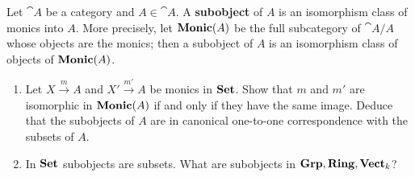 \documentclass[11pt,a4paper]{article}
\begin{document}
\begin{exercise}
    Let $\cat{A}$ be a category and $A\in\cat{A}$. A \textbf{subobject} of $A$ is an isomorphism class of monics into $A$. More precisely, let $\mathbf{Monic}(A)$ be the full subcategory of $\cat{A}/A$ whose objects are the monics; then a subobject of $A$ is an isomorphism class of objects of $\mathbf{Monic}(A)$.
    \begin{enumerate}[label=(\alph*)]
        \item Let $X\xrightarrow{m}A$ and $X'\xrightarrow{m'}A$ be monics in $\mathbf{Set}$. Show that $m$ and $m'$ are isomorphic in $\mathbf{Monic}(A)$ if and only if they have the same image. Deduce that the subobjects of $A$ are in canonical one-to-one correspondence with the subsets of $A$.
        \item In $\mathbf{Set}$ subobjects are subsets. What are subobjects in $\mathbf{Grp}, \mathbf{Ring}, \mathbf{Vect}_k$?
    \end{enumerate}
\end{exercise}
\end{document}
